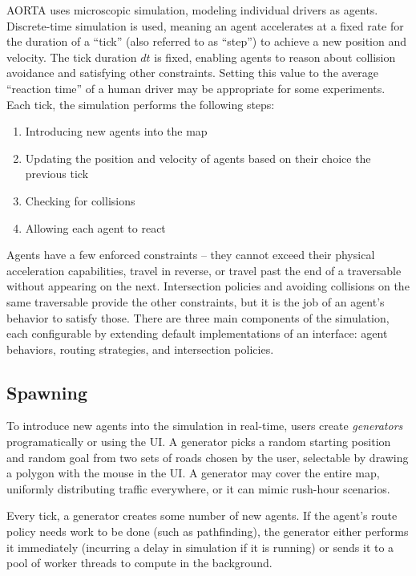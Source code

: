 \documentclass[letterpaper, 10 pt, conference]{ieeeconf}  %
\begin{document}
AORTA uses microscopic simulation, modeling individual drivers as agents.
Discrete-time simulation is used, meaning an agent accelerates at a fixed rate
for the duration of a ``tick'' (also referred to as ``step'') to achieve a new
position and velocity. The tick duration $dt$ is fixed, enabling agents to
reason about collision avoidance and satisfying other constraints. Setting this
value to the average ``reaction time'' of a human driver may be appropriate for
some experiments. Each tick, the simulation performs the following steps:

\begin{enumerate}
  \item Introducing new agents into the map
  \item Updating the position and velocity of agents based on their choice the
        previous tick
  \item Checking for collisions
  \item Allowing each agent to react
\end{enumerate}

Agents have a few enforced constraints -- they cannot exceed their physical
acceleration capabilities, travel in reverse, or travel past the end of a
traversable without appearing on the next. Intersection policies and avoiding
collisions on the same traversable provide the other constraints, but it is the
job of an agent's behavior to satisfy those. There are three main components of
the simulation, each configurable by extending default implementations of an
interface: agent behaviors, routing strategies, and intersection policies.


\subsection{Spawning}

To introduce new agents into the simulation in real-time, users create
\emph{generators} programatically or using the UI. A generator picks a random
starting position and random goal from two sets of roads chosen by the user,
selectable by drawing a polygon with the mouse in the UI. A generator may cover
the entire map, uniformly distributing traffic everywhere, or it can mimic
rush-hour scenarios.

Every tick, a generator creates some number of new agents. If the agent's route
policy needs work to be done (such as pathfinding), the generator either
performs it immediately (incurring a delay in simulation if it is running) or
sends it to a pool of worker threads to compute in the background.
\end{document}

